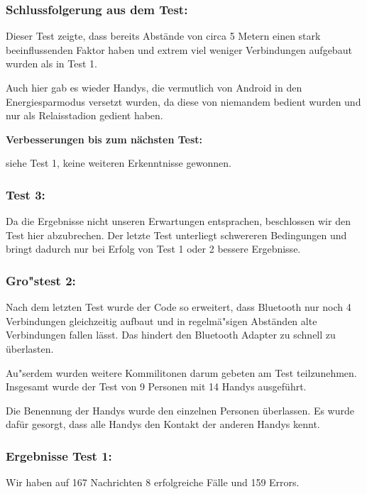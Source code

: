 \subsubsection{Schlussfolgerung aus dem
Test:}\label{schlussfolgerung-aus-dem-test-1}

Dieser Test zeigte, dass bereits Abstände von circa 5 Metern einen stark
beeinflussenden Faktor haben und extrem viel weniger Verbindungen
aufgebaut wurden als in Test 1.

Auch hier gab es wieder Handys, die vermutlich von Android in den
Energiesparmodus versetzt wurden, da diese von niemandem bedient wurden
und nur als Relaisstadion gedient haben.

\textbf{Verbesserungen bis zum nächsten Test:}

siehe Test 1, keine weiteren Erkenntnisse gewonnen.

\subsubsection{Test 3:}\label{test-3}

Da die Ergebnisse nicht unseren Erwartungen entsprachen, beschlossen wir
den Test hier abzubrechen. Der letzte Test unterliegt schwereren
Bedingungen und bringt dadurch nur bei Erfolg von Test 1 oder 2 bessere
Ergebnisse.

\subsubsection{Gro"stest 2:}\label{grosstest-2}

Nach dem letzten Test wurde der Code so erweitert, dass Bluetooth nur
noch 4 Verbindungen gleichzeitig aufbaut und in regelmä"sigen Abständen
alte Verbindungen fallen lässt. Das hindert den Bluetooth Adapter zu
schnell zu überlasten.

Au"serdem wurden weitere Kommilitonen darum gebeten am Test teilzunehmen.
Insgesamt wurde der Test von 9 Personen mit 14 Handys ausgeführt.

Die Benennung der Handys wurde den einzelnen Personen überlassen. Es
wurde dafür gesorgt, dass alle Handys den Kontakt der anderen Handys
kennt.

\subsubsection{Ergebnisse Test 1:}\label{ergebnisse-test-1-1}

Wir haben auf 167 Nachrichten 8 erfolgreiche Fälle und 159 Errors.

